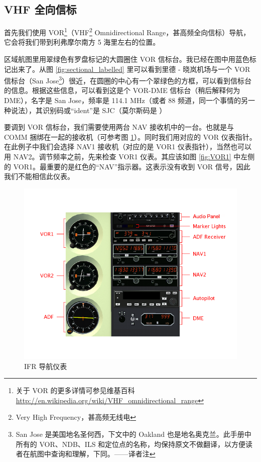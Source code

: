 \subsection{VHF 全向信标}

首先我们使用 VOR\footnote{关于 VOR 的更多详情可参见维基百科 \url{http://en.wikipedia.org/wiki/VHF_omnidirectional_range}}（VHF\footnote{Very High Frequency，甚高频无线电} Omnidirectional Range，甚高频全向信标）导航，它会将我们带到利弗摩尔南方 5 海里左右的位置。

区域航图里用翠绿色有罗盘标记的大圆圈住 VOR 信标台。我已经在图中用蓝色标记出来了。从图 \ref{fig:sectional_labelled} 里可以看到里德 - 晓岚机场与一个 VOR 信标台（San Jose\footnote{San Jose 是美国地名圣何西，下文中的 Oakland 也是地名奥克兰。此手册中所有的 VOR、NDB、ILS 和定位点的名称，均保持原文不做翻译，以方便读者在航图中查询和理解，下同。——译者注}）很近，在圆圈的中心有一个翠绿色的方框，可以看到信标台的信息。根据这些信息，可以看到这是个 VOR-DME 信标台（稍后解释何为 DME），名字是 San Jose，频率是 114.1 MHz（或者 88 频道，同一个事情的另一种说法），其识别码或“ident”是 SJC（莫尔斯码是 \mdot\mdot\mdot\mspace\mdot\mdash\mdash\mdash\mspace \mdash\mdot\mdash\mdot）

要调到 VOR 信标台，我们需要使用两台 NAV 接收机中的一台。也就是与 COMM 捆绑在一起的接收机（可参考图 \ref{fig:panel}）。同时我们用对应的 VOR 仪表指针。在此例子中我们会选择 NAV1 接收机（对应的是 VOR1 仪表指针），当然也可以用 NAV2。调节频率之前，先来检查 VOR1 仪表。其应该如图 \ref{fig:VOR1} 中左侧的 VOR1。最重要的是红色的“NAV”指示器。这表示没有收到 VOR 信号，因此我们不能相信此仪表。

\begin{figure}
  \begin{center}
    \includegraphics[width=12cm]{img/panel_labelled}
    \caption{IFR 导航仪表}
    \label{fig:panel}
  \end{center}
\end{figure}

